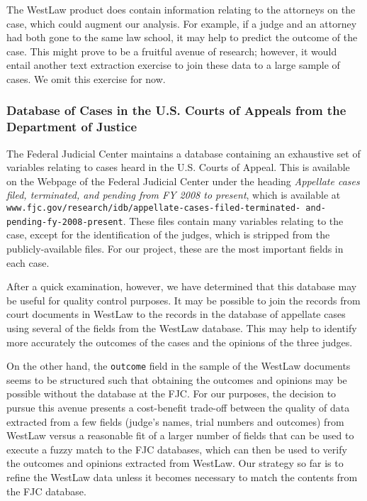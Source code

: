 \documentclass[11pt]{paper}
\begin{document}
The WestLaw product does contain information relating to the attorneys on the case, which could augment our analysis. 
For example, if a judge and an attorney had both gone to the same law school, 
it may help to predict the outcome of the case. 
This might prove to be a fruitful avenue of research; 
however, it would entail another text extraction exercise to join these data
to a large sample of cases. 
We omit this exercise for now. 



\subsubsection{Database of Cases in the U.S. Courts of Appeals 
	from the Department of Justice} \label{sec:FJC_appeals}

The Federal Judicial Center maintains a database containing an
exhaustive set of variables relating to cases heard in the U.S. Courts of Appeal. 
This is available on the Webpage 
of the Federal Judicial Center under the heading
{\it Appellate cases filed, terminated, and pending from FY 2008 to present}, 
which is available at 
\texttt{www.fjc.gov/research/idb/appellate-cases-filed-terminated-
and-pending-fy-2008-present}.
These files contain many variables relating to the case, except for
the identification of the judges, which is stripped from the publicly-available files. 
For our project, these are the most important fields in each case. 

After a quick examination, however, we have determined that this database may be useful
for quality control purposes.
It may be possible to join the records from court documents in WestLaw
to the records in the database of appellate cases using several of
the fields from the WestLaw database. 
This may help to identify more accurately the outcomes of the cases and the opinions of the three judges.

On the other hand, the \texttt{outcome} field in the sample of the WestLaw documents seems to be structured such that obtaining the outcomes and opinions may be possible without the database at the FJC. 
For our purposes, the decision to pursue this avenue presents a cost-benefit
trade-off between the quality of data extracted from a few fields (judge's names, trial numbers and outcomes) from WestLaw
versus a reasonable fit of a larger number of fields that can be used to
execute a fuzzy match to the FJC databases, which can then be used to verify the outcomes and opinions extracted from WestLaw. 
Our strategy so far is to refine the WestLaw data unless it becomes necessary to match the contents from the FJC database. 
\end{document}
